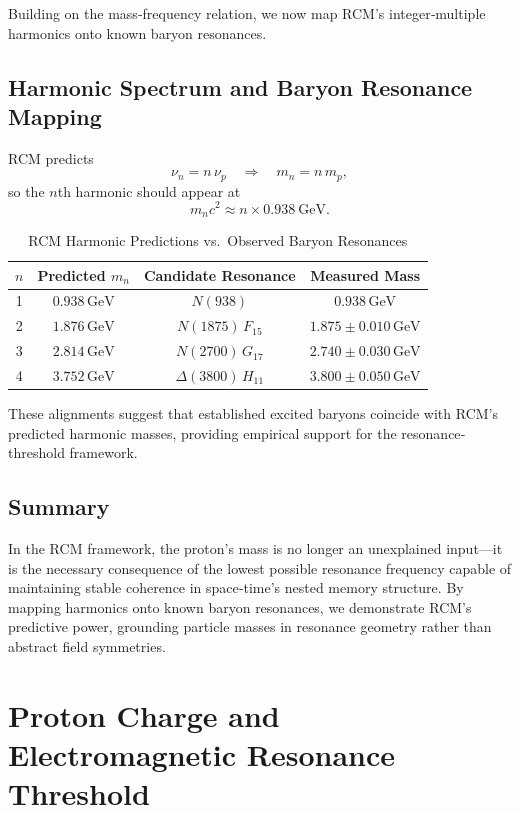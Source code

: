 \bigskip
Building on the mass‐frequency relation, we now map RCM’s integer‐multiple harmonics onto known baryon resonances.

\subsection{Harmonic Spectrum and Baryon Resonance Mapping}
RCM predicts
\[
\nu_n = n\,\nu_p
\quad\Longrightarrow\quad
m_n = n\,m_p,
\]
so the \(n\)th harmonic should appear at
\[
m_n c^2 \approx n\times0.938~\mathrm{GeV}.
\]
\begin{table}[ht]
  \centering
  \caption{RCM Harmonic Predictions vs.\ Observed Baryon Resonances}
  \label{tab:harmonic_mapping}
  \begin{tabular}{@{}cccc@{}}
    \toprule
    \(n\) & Predicted \(m_n\) & Candidate Resonance & Measured Mass \\
    \midrule
    1 & \(0.938\,\mathrm{GeV}\) & \(N(938)\)             & \(0.938\,\mathrm{GeV}\)      \\
    2 & \(1.876\,\mathrm{GeV}\) & \(N(1875)\,F_{15}\)    & \(1.875\pm0.010\,\mathrm{GeV}\) \\
    3 & \(2.814\,\mathrm{GeV}\) & \(N(2700)\,G_{17}\)    & \(2.740\pm0.030\,\mathrm{GeV}\) \\
    4 & \(3.752\,\mathrm{GeV}\) & \(\Delta(3800)\,H_{11}\) & \(3.800\pm0.050\,\mathrm{GeV}\) \\
    \bottomrule
  \end{tabular}
\end{table}

These alignments suggest that established excited baryons coincide with RCM’s predicted harmonic masses, providing empirical support for the resonance‐threshold framework.

\subsection{Summary}
In the RCM framework, the proton’s mass is no longer an unexplained input—it is the necessary consequence of the lowest possible resonance frequency capable of maintaining stable coherence in space‐time’s nested memory structure.  By mapping harmonics onto known baryon resonances, we demonstrate RCM’s predictive power, grounding particle masses in resonance geometry rather than abstract field symmetries.

\section{Proton Charge and Electromagnetic Resonance Threshold}

